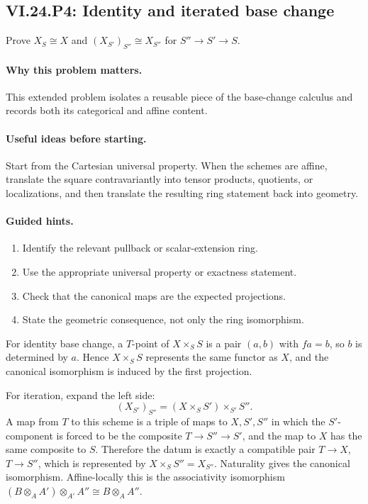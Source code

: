 \subsection*{VI.24.P4: Identity and iterated base change}
\begin{problem}\label{prob:vi24-p04}
Prove $X_S\cong X$ and $(X_{S'})_{S''}\cong X_{S''}$ for $S''\to S'\to S$.
\end{problem}

\ifdefined\FullProblemDossiers
\paragraph{Why this problem matters.}
This extended problem isolates a reusable piece of the base-change calculus and records both its categorical and affine content.

\paragraph{Useful ideas before starting.}
Start from the Cartesian universal property.  When the schemes are affine, translate the square contravariantly into tensor products, quotients, or localizations, and then translate the resulting ring statement back into geometry.

\paragraph{Guided hints.}
\begin{enumerate}
\item Identify the relevant pullback or scalar-extension ring.
\item Use the appropriate universal property or exactness statement.
\item Check that the canonical maps are the expected projections.
\item State the geometric consequence, not only the ring isomorphism.
\end{enumerate}

\begin{solution}
For identity base change, a $T$-point of $X\times_SS$ is a pair $(a,b)$ with $fa=b$, so $b$ is determined by $a$.  Hence $X\times_SS$ represents the same functor as $X$, and the canonical isomorphism is induced by the first projection.

For iteration, expand the left side:
\[
(X_{S'})_{S''}=(X\times_SS')\times_{S'}S''.
\]
A map from $T$ to this scheme is a triple of maps to $X,S',S''$ in which the $S'$-component is forced to be the composite $T\to S''\to S'$, and the map to $X$ has the same composite to $S$.  Therefore the datum is exactly a compatible pair $T\to X$, $T\to S''$, which is represented by $X\times_SS''=X_{S''}$.  Naturality gives the canonical isomorphism.  Affine-locally this is the associativity isomorphism $(B\otimes_AA')\otimes_{A'}A''\cong B\otimes_AA''$.
\end{solution}

